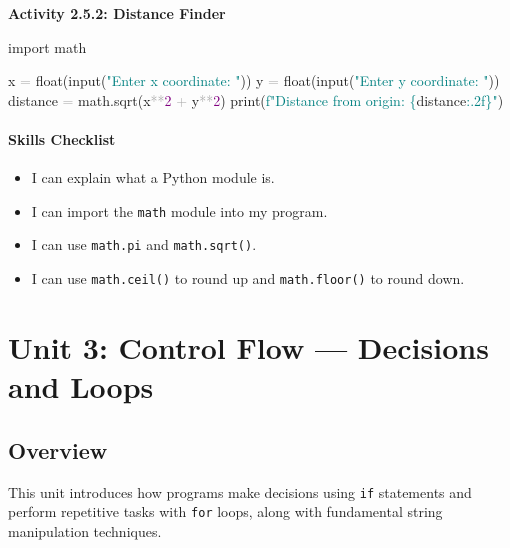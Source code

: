 \documentclass[
  justified,
  openright,
]{tufte-book}
\let\subsubsection\paragraph
\let\paragraph\paragraph
\newcommand{\BuiltInTok}[1]{#1}
\newcommand{\DecValTok}[1]{\textcolor{Purple}{#1}}
\newcommand{\ImportTok}[1]{\textcolor{BrandAccent}{#1}}
\newcommand{\NormalTok}[1]{#1}
\newcommand{\OperatorTok}[1]{\textcolor{DarkGray}{#1}}
\newcommand{\SpecialCharTok}[1]{\textcolor{Teal}{#1}}
\newcommand{\SpecialStringTok}[1]{\textcolor{Teal}{#1}}
\newcommand{\StringTok}[1]{\textcolor{Teal}{#1}}
\newenvironment{Shaded}{%
  \begin{snugshade}
}{%
  \end{snugshade}
}
\let\subsubsection\paragraph
\let\paragraph\paragraph
\providecommand{\tightlist}{%
  \setlength{\itemsep}{0pt}\setlength{\parskip}{0pt}}
\begin{document}
\textbf{Activity 2.5.2: Distance Finder}

\begin{Shaded}
\begin{Highlighting}[]
\ImportTok{import}\NormalTok{ math}

\NormalTok{x }\OperatorTok{=} \BuiltInTok{float}\NormalTok{(}\BuiltInTok{input}\NormalTok{(}\StringTok{"Enter x coordinate: "}\NormalTok{))}
\NormalTok{y }\OperatorTok{=} \BuiltInTok{float}\NormalTok{(}\BuiltInTok{input}\NormalTok{(}\StringTok{"Enter y coordinate: "}\NormalTok{))}
\NormalTok{distance }\OperatorTok{=}\NormalTok{ math.sqrt(x}\OperatorTok{**}\DecValTok{2} \OperatorTok{+}\NormalTok{ y}\OperatorTok{**}\DecValTok{2}\NormalTok{)}
\BuiltInTok{print}\NormalTok{(}\SpecialStringTok{f"Distance from origin: }\SpecialCharTok{\{}\NormalTok{distance}\SpecialCharTok{:.2f\}}\SpecialStringTok{"}\NormalTok{)}
\end{Highlighting}
\end{Shaded}

\subsubsection{Skills Checklist}\label{skills-checklist-11}

\begin{itemize}
\tightlist
\item[$\square$]
  I can explain what a Python module is.
\item[$\square$]
  I can import the \texttt{math} module into my program.
\item[$\square$]
  I can use \texttt{math.pi} and \texttt{math.sqrt()}.
\item[$\square$]
  I can use \texttt{math.ceil()} to round up and \texttt{math.floor()}
  to round down.
\end{itemize}

\newpage

\section{Unit 3: Control Flow --- Decisions and
Loops}\label{unit-3-control-flow-decisions-and-loops-1}

\subsection{Overview}\label{overview-3}

This unit introduces how programs make decisions using \texttt{if}
statements and perform repetitive tasks with \texttt{for} loops, along
with fundamental string manipulation techniques.
\end{document}
